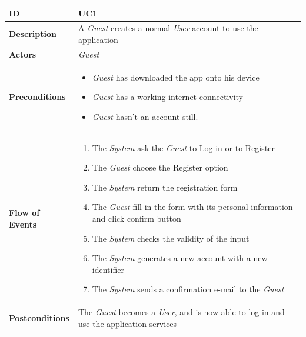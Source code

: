 

\begin{table}[ht]
\begin{tabular}{|l|p{}|}
\hline
\textbf{ID}             & UC1                                                                             \\ \hline
\textbf{Description}    & A \textit{Guest} creates a normal \textit{User} account to use the application \\ \hline
\textbf{Actors}         &   \textit{Guest}                                                                            \\ \hline

\textbf{Preconditions}  &   \begin{itemize}

 \item \textit{Guest} has downloaded the app onto his device
   \item      \textit{Guest} has a working internet connectivity
     \item       \textit{Guest} hasn't an account still.
                 \end{itemize}     
                    \\ \hline
                    
\textbf{Flow of Events} &   \begin{enumerate}
    \item The \textit{System} ask the \textit{Guest} to Log in or to Register
    \item The \textit{Guest} choose the Register option
    \item The \textit{System} return the registration form
    \item The \textit{Guest} fill in the form with its personal information and click confirm button
    \item The \textit{System} checks the validity of the input
    \item The \textit{System} generates a new account with a new identifier
    \item The \textit{System} sends a confirmation e-mail to the \textit{Guest}
\end{enumerate}                                                                             \\ \hline
\textbf{Postconditions} &  The \textit{Guest} becomes a \textit{User}, and is now able to log in and use the application services                                                                     \\ \hline


\end{tabular}
\end{table}
